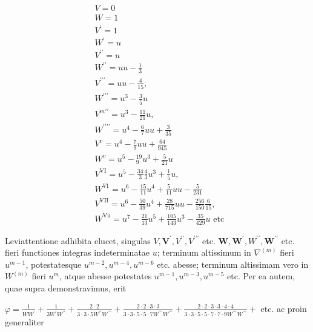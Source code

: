 \documentclass[10pt]{article}
\begin{document}
\[
\begin{aligned}
& V=0 \\
& W=1 \\
& V^{\prime}=1 \\
& W^{\prime}=u \\
& V^{\prime \prime}=u \\
& W^{\prime \prime}=u u-\frac{1}{3} \\
& V^{\prime \prime \prime}=u u-\frac{4}{15}, \\
& W^{\prime \prime \prime}=u^{3}-\frac{3}{5} u \\
& V^{m \prime \prime}=u^{3}-\frac{11}{21} u, \\
& W^{\prime \prime \prime \prime}=u^{4}-\frac{6}{7} u u+\frac{3}{35} \\
& V^{v}=u^{4}-\frac{7}{9} u u+\frac{64}{945} \\
& W^{v}=u^{5}-{ }_{9}^{19} u^{3}+\frac{5}{21} u \\
& V^{\mathrm{VI}}=u^{5}-\frac{34}{3} \frac{4}{3} u^{3}+\frac{1}{5} u, \\
& W^{V 1}=u^{6}-\frac{15}{11} u^{4}+\frac{5}{11} u u-\frac{5}{231} \\
& V^{\mathrm{VII}}=u^{6}-\frac{50}{39} u^{4}+\frac{28}{715} u u-\frac{256}{150} \frac{6}{15}, \\
& W^{\mathrm{Vu}}=u^{7}-\frac{21}{13} u^{5}+\frac{105}{143} u^{3}-\frac{35}{429} u \text { etc }
\end{aligned}
\]

Leviattentione adhibita elucet, singulas \(V, \boldsymbol{V}^{\prime}, V^{\prime \prime}, V^{\prime \prime \prime}\) etc. \(\boldsymbol{W}, \boldsymbol{W}^{\prime}, W^{\prime \prime}, \boldsymbol{W}^{\prime \prime}\) etc. fieri functiones integras indeterminatae \(u\); terminum altissimum in \(\nabla^{(m)}\) fieri \(u^{m-1}\), potestatesque \(u^{m-2}, u^{m-4}, u^{m-6}\) etc. abesse; terminum altissimam vero in \(W^{(m)}\) fieri \(u^{m}\), atque abesse potestates \(u^{m-1}, u^{m-3}, u^{m-5}\) etc. Per ea autem, quae supra demonstravimus, erit

\(\varphi=\frac{1}{W W^{\prime}}+\frac{1}{3 W^{\prime} W^{\prime \prime}}+\frac{2 \cdot 2}{3 \cdot 3 \cdot 5 W^{\prime \prime} W^{\prime \prime \prime}}+\frac{2 \cdot 2 \cdot 3 \cdot 3}{3 \cdot 3 \cdot 5 \cdot 5 \cdot 7 W^{\prime \prime \prime} W^{\prime \prime \prime}}+\frac{2 \cdot 2 \cdot 3 \cdot 3 \cdot 4 \cdot 4}{3 \cdot 3 \cdot 5 \cdot 5 \cdot 7 \cdot 7 \cdot 9 W^{\prime \prime \prime} W^{\prime \prime \prime}}+\) etc. ac proin generaliter
\end{document}
